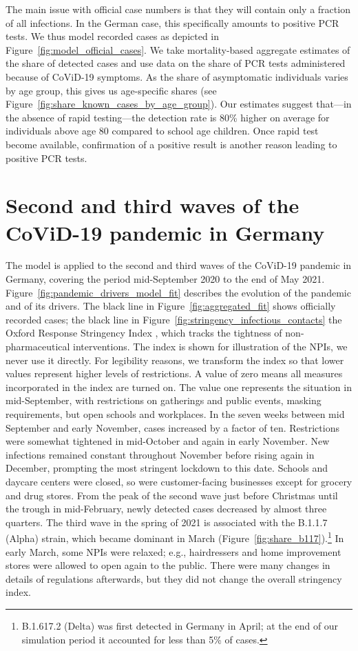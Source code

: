 The main issue with official case numbers is that they will contain only a fraction of
all infections. In the German case, this specifically amounts to positive PCR tests. We
thus model recorded cases as depicted in Figure~\ref{fig:model_official_cases}. We take
mortality-based aggregate estimates of the share of detected cases and use data on the
share of PCR tests administered because of CoViD-19
symptoms. As the share of asymptomatic individuals
varies by age group, this gives us age-specific shares (see
Figure~\ref{fig:share_known_cases_by_age_group}). Our estimates suggest that---in the
absence of rapid testing---the detection rate is 80\% higher on average for individuals
above age 80 compared to school age children. Once rapid test become available,
confirmation of a positive result is another reason leading to positive PCR tests.

\section{Second and third waves of the CoViD-19 pandemic in Germany}

The model is applied to the second and third waves of the CoViD-19 pandemic in Germany,
covering the period mid-September 2020 to the end of May 2021.
Figure~\ref{fig:pandemic_drivers_model_fit} describes the evolution of the pandemic and
of its drivers. The black line in Figure~\ref{fig:aggregated_fit} shows officially
recorded cases; the black line in Figure~\ref{fig:stringency_infectious_contacts} the
Oxford Response Stringency Index \citep{Hale2020}, which tracks the tightness of
non-pharmaceutical interventions. The index is shown for illustration of the NPIs, we
never use it directly. For legibility reasons, we transform the index so that lower
values represent higher levels of restrictions. A value of zero means all measures
incorporated in the index are turned on. The value one represents the situation in
mid-September, with restrictions on gatherings and public events, masking requirements,
but open schools and workplaces. In the seven weeks between mid September and early
November, cases increased by a factor of ten. Restrictions were somewhat tightened in
mid-October and again in early November. New infections remained constant throughout
November before rising again in December, prompting the most stringent lockdown to this
date. Schools and daycare centers were closed, so were customer-facing businesses except
for grocery and drug stores. From the peak of the second wave just before Christmas
until the trough in mid-February, newly detected cases decreased by almost three
quarters. The third wave in the spring of 2021 is associated with the B.1.1.7 (Alpha)
strain, which became dominant in March (Figure~\ref{fig:share_b117}).\footnote{B.1.617.2
(Delta) was first detected in Germany in April; at the end of our simulation period it
accounted for less than 5\% of cases.} In early March, some NPIs were relaxed; e.g.,
hairdressers and home improvement stores were allowed to open again to the public. There
were many changes in details of regulations afterwards, but they did not change the
overall stringency index.

